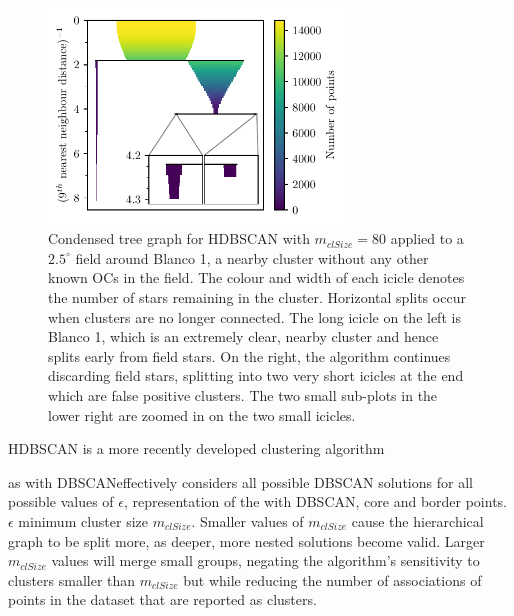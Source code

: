 \begin{figure}[t]
   \centering
   \includegraphics[width=0.7\textwidth]{fig/c2/fig_hdbscan.pdf}
   \caption[Condensed tree graph for HDBSCAN with $m_{clSize}=80$ applied to a $2.5^{\circ}$ field around Blanco 1]{Condensed tree graph for HDBSCAN with $m_{clSize}=80$ applied to a $2.5^{\circ}$ field around Blanco 1, a nearby cluster without any other known OCs in the field. The colour and width of each icicle denotes the number of stars remaining in the cluster. Horizontal splits occur when clusters are no longer connected. The long icicle on the left is Blanco 1, which is an extremely clear, nearby cluster and hence splits early from field stars. On the right, the algorithm continues discarding field stars, splitting into two very short icicles at the end which are false positive clusters. The two small sub-plots in the lower right are zoomed in on the two small icicles.}\label{c2:fig:hdbscan}%
\end{figure}

HDBSCAN \citep{hutchison_hdbscan_2013} is a more recently developed clustering algorithm 

as with DBSCANeffectively considers all possible DBSCAN solutions for all possible values of $\epsilon$, representation of the with DBSCAN, core and border points. $\epsilon$ minimum cluster size $m_{clSize}$. Smaller values of $m_{clSize}$ cause the hierarchical graph to be split more, as deeper, more nested solutions become valid. Larger $m_{clSize}$ values will merge small groups, negating the algorithm's sensitivity to clusters smaller than $m_{clSize}$ but while reducing the number of associations of points in the dataset that are reported as clusters.

